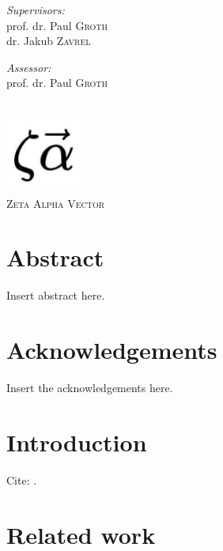 \documentclass[12pt]{report}
\begin{document}
\begin{titlepage}
\noindent
\begin{minipage}[t]{0.4\textwidth}
\begin{flushleft} \large
\emph{Supervisors:} \\
prof. dr. Paul \textsc{Groth}\\
dr. Jakub \textsc{Zavrel}
\end{flushleft}
\end{minipage}
\begin{minipage}[t]{0.4\textwidth}
\begin{flushright} \large
\emph{Assessor:} \\
prof. dr. Paul \textsc{Groth}\\
\end{flushright}
\end{minipage}\\[2cm]


\includegraphics[width=2.5cm]{assets/zeta-alpha-logo.jpg}\\ %
\textsc{\large Zeta Alpha Vector}\\[1.0cm] %
 

\vfill %

\end{titlepage}

\chapter*{Abstract}

Insert abstract here.

\chapter*{Acknowledgements}

Insert the acknowledgements here.

\tableofcontents

\chapter{Introduction}

Cite: \citep{Heng_Wang_2015}.

\chapter{Related work}



\end{document}
